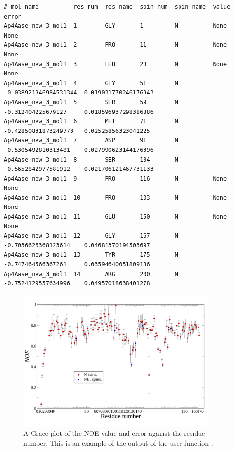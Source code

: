 {\scriptsize \begin{verbatim}
# mol_name          res_num  res_name  spin_num  spin_name  value                  error                   
Ap4Aase_new_3_mol1  1        GLY       1         N          None                   None                    
Ap4Aase_new_3_mol1  2        PRO       11        N          None                   None                    
Ap4Aase_new_3_mol1  3        LEU       28        N          None                   None                    
Ap4Aase_new_3_mol1  4        GLY       51        N          -0.038921946984531344  0.019031770246176943    
Ap4Aase_new_3_mol1  5        SER       59        N          -0.312404225679127     0.018596937298386886    
Ap4Aase_new_3_mol1  6        MET       71        N          -0.42850831873249773   0.02525856323041225     
Ap4Aase_new_3_mol1  7        ASP       91        N          -0.5305492810313481    0.027990623144176396    
Ap4Aase_new_3_mol1  8        SER       104       N          -0.5652842977581912    0.021706121467731133    
Ap4Aase_new_3_mol1  9        PRO       116       N          None                   None                    
Ap4Aase_new_3_mol1  10       PRO       133       N          None                   None                    
Ap4Aase_new_3_mol1  11       GLU       150       N          None                   None                    
Ap4Aase_new_3_mol1  12       GLY       167       N          -0.7036626368123614    0.04681370194503697     
Ap4Aase_new_3_mol1  13       TYR       175       N          -0.747464566367261     0.03594640051809186     
Ap4Aase_new_3_mol1  14       ARG       200       N          -0.7524129557634996    0.04957018638401278     
\end{verbatim}}




\begin{figure}
\centerline{\includegraphics[width=0.9\textwidth, bb=0 -1 826 521]{graphics/screenshots/noe_analysis/grace}}
\caption[NOE plot]{A Grace plot of the NOE value and error against the residue number.  This is an example of the output of the user function .}\label{fig: NOE plot}
\end{figure}



